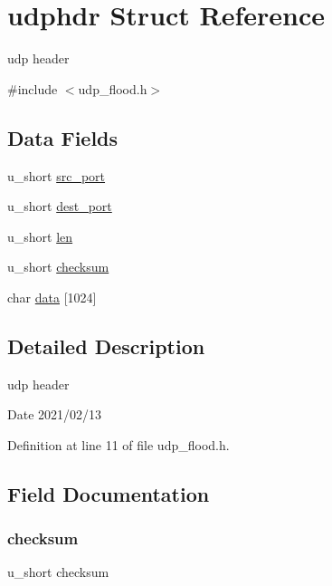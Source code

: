 \hypertarget{structudphdr}{}\section{udphdr Struct Reference}
\label{structudphdr}


udp header  




{\ttfamily \#include $<$udp\+\_\+flood.\+h$>$}

\subsection*{Data Fields}
\begin{DoxyCompactItemize}
\item 
u\+\_\+short \hyperlink{structudphdr_a422cf8a490ad495e860fd1d07d12c41d}{src\+\_\+port}
\item 
u\+\_\+short \hyperlink{structudphdr_af94483ddcebec702e7f980844356a789}{dest\+\_\+port}
\item 
u\+\_\+short \hyperlink{structudphdr_aa8fdda3681f58ac74bc52f6b3dc1aebc}{len}
\item 
u\+\_\+short \hyperlink{structudphdr_af5e46cf5da434e352817c9b18a5918aa}{checksum}
\item 
char \hyperlink{structudphdr_adc6d9f8f602e5f6d0953eb7fdc1a775c}{data} \mbox{[}1024\mbox{]}
\end{DoxyCompactItemize}


\subsection{Detailed Description}
udp header 

\begin{DoxyDate}{Date}
2021/02/13 
\end{DoxyDate}


Definition at line 11 of file udp\+\_\+flood.\+h.



\subsection{Field Documentation}
\mbox{\label{structudphdr_af5e46cf5da434e352817c9b18a5918aa}} 
\subsubsection{\texorpdfstring{checksum}{checksum}}
{\footnotesize\ttfamily u\+\_\+short checksum}

